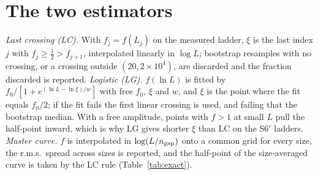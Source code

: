 \documentclass[reprint,amsmath,amssymb,aps,pre,longbibliography]{revtex4-2}
\begin{document}
\section{The two estimators}\label{app:est}

\emph{Last crossing (LC).} With $f_j=f(L_j)$ on the measured ladder, $\xi$ is the last index
$j$ with $f_{j}\ge\frac12>f_{j+1}$, interpolated linearly in $\log L$; bootstrap resamples
with no crossing, or a crossing outside $(20,2\times10^{4})$, are discarded and the fraction
discarded is reported.
\emph{Logistic (LG).} $f(\ln L)$ is fitted by $f_0/[1+e^{(\ln L-\ln\xi)/w}]$ with free
$f_0$, $\xi$ and $w$, and $\xi$ is the point where the fit equals $f_0/2$; if the fit fails
the first linear crossing is used, and failing that the bootstrap median. With a free
amplitude, points with $f>1$ at small $L$ pull the half-point inward, which is why LG gives
shorter $\xi$ than LC on the S6$'$ ladders.
\emph{Master curve.} $f$ is interpolated in $\log(L/n_{\rm gap})$ onto a common grid for
every size, the r.m.s.\ spread across sizes is reported, and the half-point of the
size-averaged curve is taken by the LC rule (Table~\ref{tab:exact}).
\end{document}
